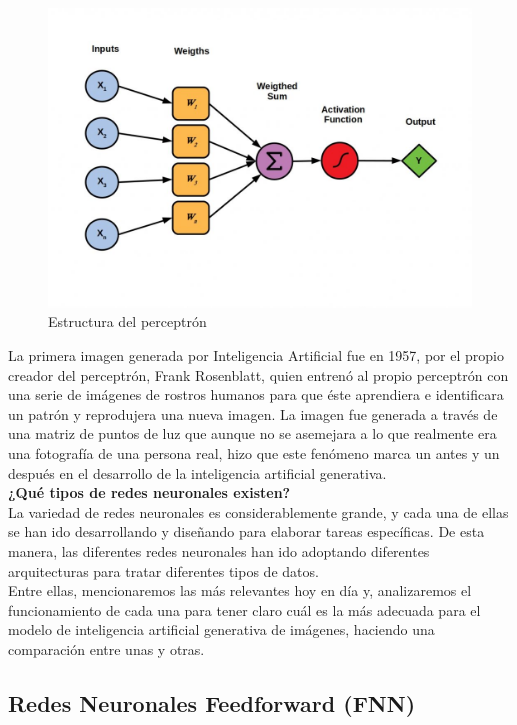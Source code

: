 \begin{figure}[h]
	\centering
	\includegraphics[width = 1 \textwidth]{Imagenes/Vectorial/Perceptrones.jpeg}
	\caption{Estructura del perceptrón \citep{structpercep}}
	\label{fig:perceptron}
\end{figure}

La primera imagen generada por Inteligencia Artificial fue en 1957, por el propio creador del perceptrón, Frank Rosenblatt, quien entrenó al propio perceptrón con una serie de imágenes de rostros humanos para que éste aprendiera e identificara un patrón y reprodujera una nueva imagen. La imagen fue generada a través de una matriz de puntos de luz que aunque no se asemejara a lo que realmente era una fotografía de una persona real, hizo que este fenómeno marca un antes y un después en el desarrollo de la inteligencia artificial generativa.\\

\textbf{¿Qué tipos de redes neuronales existen?}\\

La variedad de redes neuronales es considerablemente grande, y cada una de ellas se han ido desarrollando y diseñando para elaborar tareas específicas. De esta manera, las diferentes redes neuronales han ido adoptando diferentes arquitecturas para tratar diferentes tipos de datos.\\
Entre ellas, mencionaremos las más relevantes hoy en día y, analizaremos el funcionamiento de cada una para tener claro cuál es la más adecuada para el modelo de inteligencia artificial generativa de imágenes, haciendo una comparación entre unas y otras.

\subsection{Redes Neuronales Feedforward (FNN)}

